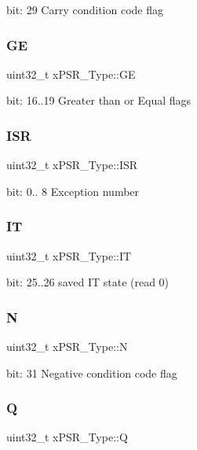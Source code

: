 bit\+: 29 Carry condition code flag \mbox{\label{unionxPSR__Type_a2d0ec4ccae337c1df5658f8cf4632e76}} 
\subsubsection{\texorpdfstring{GE}{GE}}
{\footnotesize\ttfamily uint32\+\_\+t x\+P\+S\+R\+\_\+\+Type\+::\+GE}

bit\+: 16..19 Greater than or Equal flags \mbox{\label{unionxPSR__Type_a3e9120dcf1a829fc8d2302b4d0673970}} 
\subsubsection{\texorpdfstring{ISR}{ISR}}
{\footnotesize\ttfamily uint32\+\_\+t x\+P\+S\+R\+\_\+\+Type\+::\+I\+SR}

bit\+: 0.. 8 Exception number \mbox{\label{unionxPSR__Type_a3200966922a194d84425e2807a7f1328}} 
\subsubsection{\texorpdfstring{IT}{IT}}
{\footnotesize\ttfamily uint32\+\_\+t x\+P\+S\+R\+\_\+\+Type\+::\+IT}

bit\+: 25..26 saved IT state (read 0) \mbox{\label{unionxPSR__Type_a2db9a52f6d42809627d1a7a607c5dbc5}} 
\subsubsection{\texorpdfstring{N}{N}}
{\footnotesize\ttfamily uint32\+\_\+t x\+P\+S\+R\+\_\+\+Type\+::N}

bit\+: 31 Negative condition code flag \mbox{\label{unionxPSR__Type_add7cbd2b0abd8954d62cd7831796ac7c}} 
\subsubsection{\texorpdfstring{Q}{Q}}
{\footnotesize\ttfamily uint32\+\_\+t x\+P\+S\+R\+\_\+\+Type\+::Q}

